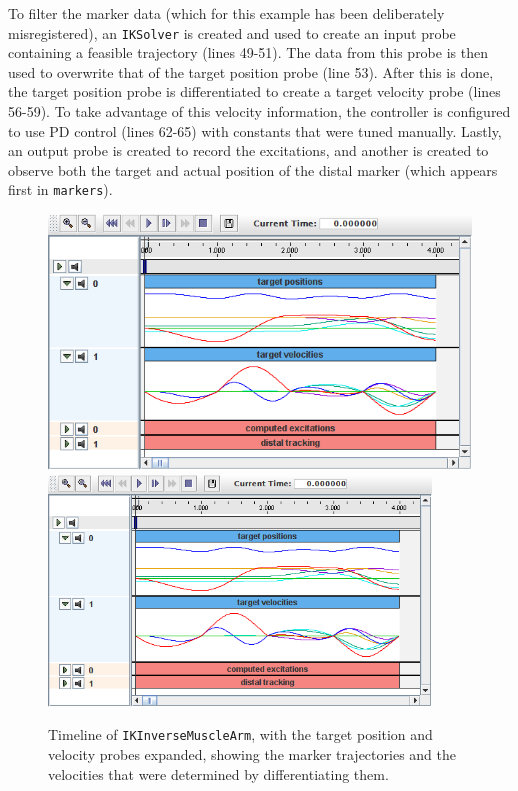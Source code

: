 To filter the marker data (which for this example has been deliberately
misregistered), an {\tt IKSolver} is created and used to create an input probe
containing a feasible trajectory (lines 49-51). The data from this probe is
then used to overwrite that of the target position probe (line 53). After this
is done, the target position probe is differentiated to create a target
velocity probe (lines 56-59). To take advantage of this velocity information,
the controller is configured to use PD control (lines 62-65) with constants
that were tuned manually. Lastly, an output probe is created to record the
excitations, and another is created to observe both the target and actual
position of the distal marker (which appears first in {\tt markers}).

\begin{figure}[ht]
\begin{center}
\iflatexml
 \includegraphics[]{images/IKInverseMuscleArmTimeline}
\else
 \includegraphics[width=4in]{images/IKInverseMuscleArmTimeline}
\fi
\end{center}
\caption{Timeline of {\tt IKInverseMuscleArm}, with the target position and
velocity probes expanded, showing the marker trajectories and the velocities
that were determined by differentiating them.}
\label{IKInverseMuscleArmTimeline:fig}
\end{figure}

